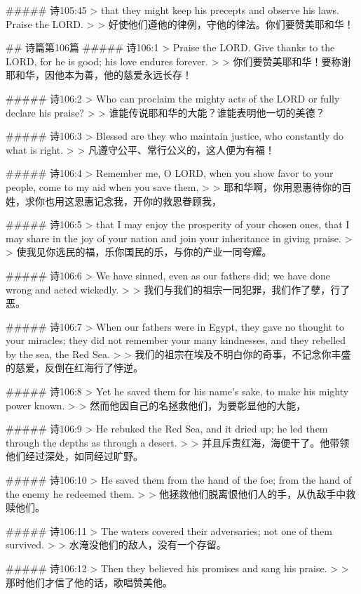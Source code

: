##### 诗105:45
> that they might keep his precepts and observe his laws. Praise the LORD.
>
> 好使他们遵他的律例，守他的律法。你们要赞美耶和华！


## 诗篇第106篇
##### 诗106:1
> Praise the LORD. Give thanks to the LORD, for he is good; his love endures forever.
>
> 你们要赞美耶和华！要称谢耶和华，因他本为善，他的慈爱永远长存！


##### 诗106:2
> Who can proclaim the mighty acts of the LORD or fully declare his praise?
>
> 谁能传说耶和华的大能？谁能表明他一切的美德？


##### 诗106:3
> Blessed are they who maintain justice, who constantly do what is right.
>
> 凡遵守公平、常行公义的，这人便为有福！


##### 诗106:4
> Remember me, O LORD, when you show favor to your people, come to my aid when you save them,
>
> 耶和华啊，你用恩惠待你的百姓，求你也用这恩惠记念我，开你的救恩眷顾我，


##### 诗106:5
> that I may enjoy the prosperity of your chosen ones, that I may share in the joy of your nation and join your inheritance in giving praise.
>
> 使我见你选民的福，乐你国民的乐，与你的产业一同夸耀。


##### 诗106:6
> We have sinned, even as our fathers did; we have done wrong and acted wickedly.
>
> 我们与我们的祖宗一同犯罪，我们作了孽，行了恶。


##### 诗106:7
> When our fathers were in Egypt, they gave no thought to your miracles; they did not remember your many kindnesses, and they rebelled by the sea, the Red Sea.
>
> 我们的祖宗在埃及不明白你的奇事，不记念你丰盛的慈爱，反倒在红海行了悖逆。


##### 诗106:8
> Yet he saved them for his name's sake, to make his mighty power known.
>
> 然而他因自己的名拯救他们，为要彰显他的大能，


##### 诗106:9
> He rebuked the Red Sea, and it dried up; he led them through the depths as through a desert.
>
> 并且斥责红海，海便干了。他带领他们经过深处，如同经过旷野。


##### 诗106:10
> He saved them from the hand of the foe; from the hand of the enemy he redeemed them.
>
> 他拯救他们脱离恨他们人的手，从仇敌手中救赎他们。


##### 诗106:11
> The waters covered their adversaries; not one of them survived.
>
> 水淹没他们的敌人，没有一个存留。


##### 诗106:12
> Then they believed his promises and sang his praise.
>
> 那时他们才信了他的话，歌唱赞美他。


